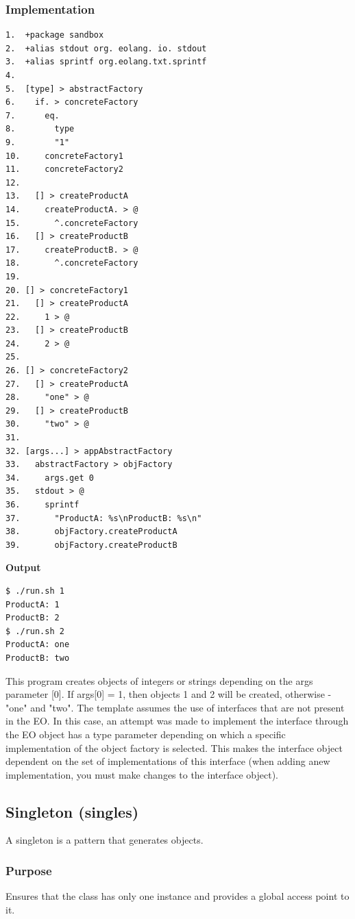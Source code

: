 \documentclass[sigplan,12pt,nonacm=true,review=false]{acmart}
\begin{document}
\subsubsection{Implementation}
\begin{verbatim}
1.	+package sandbox
2.	+alias stdout org. eolang. io. stdout
3.	+alias sprintf org.eolang.txt.sprintf
4.	
5.	[type] > abstractFactory
6.	  if. > concreteFactory
7.	    eq.
8.	      type
9.	      "1"
10.	    concreteFactory1
11.	    concreteFactory2
12.	
13.	  [] > createProductA
14.	    createProductA. > @
15.	      ^.concreteFactory
16.	  [] > createProductB
17.	    createProductB. > @
18.	      ^.concreteFactory
19.	
20.	[] > concreteFactory1
21.	  [] > createProductA
22.	    1 > @
23.	  [] > createProductB
24.	    2 > @
25.	
26.	[] > concreteFactory2
27.	  [] > createProductA
28.	    "one" > @
29.	  [] > createProductB
30.	    "two" > @
31.	
32.	[args...] > appAbstractFactory
33.	  abstractFactory > objFactory
34.	    args.get 0
35.	  stdout > @
36.	    sprintf
37.	      "ProductA: %s\nProductB: %s\n"
38.	      objFactory.createProductA
39.	      objFactory.createProductB 

\end{verbatim}


\textbf{Output}
\begin{verbatim}
$ ./run.sh 1
ProductA: 1
ProductB: 2
$ ./run.sh 2
ProductA: one
ProductB: two
\end{verbatim}


This program creates objects of integers or strings depending on the args parameter [0]. If  args[0] = 1, then objects 1 and 2 will be created, otherwise -  "one"  and  "two".
The template assumes the use of interfaces that are not present in the  EO. In this case, an attempt was made to implement the interface through the EO  object has a type parameter depending on which a specific implementation of the object factory is selected. This makes the interface object dependent on the set of implementations of this interface (when adding anew implementation, you must make changes to the interface object).

\subsection{Singleton (singles)}
A singleton is a pattern that generates objects.

\subsubsection{Purpose}
Ensures that the class has only one instance and provides a global access point to it.
\end{document}
